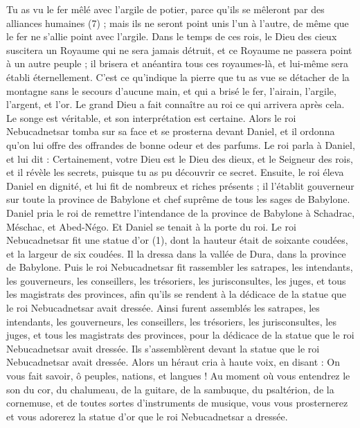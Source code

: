 \begin{multicols}{2}
Tu as vu le fer mêlé avec l’argile de potier, parce qu'ils se mêleront par des alliances humaines (7) ; mais ils ne seront point unis l’un à l'autre, de même que le fer ne s’allie point avec l’argile.
Dans le temps de ces rois, le Dieu des cieux suscitera un Royaume qui ne sera jamais détruit, et ce Royaume ne passera point à un autre peuple ; il brisera et anéantira tous ces royaumes-là, et lui-même sera établi éternellement.
C’est ce qu’indique la pierre que tu as vue se détacher de la montagne sans le secours d’aucune main, et qui a brisé le fer, l'airain, l’argile, l'argent, et l'or. Le grand Dieu a fait connaître au roi ce qui arrivera après cela. Le songe est véritable, et son interprétation est certaine.
Alors le roi Nebucadnetsar tomba sur sa face et se prosterna devant Daniel, et il ordonna qu'on lui offre des offrandes de bonne odeur et des parfums.
Le roi parla à Daniel, et lui dit : Certainement, votre Dieu est le Dieu des dieux, et le Seigneur des rois, et il révèle les secrets, puisque tu as pu découvrir ce secret.
Ensuite, le roi éleva Daniel en dignité, et lui fit de nombreux et riches présents ; il l'établit gouverneur sur toute la province de Babylone et chef suprême de tous les sages de Babylone.
Daniel pria le roi de remettre l’intendance de la province de Babylone à Schadrac, Méschac, et Abed-Négo. Et Daniel se tenait à la porte du roi.
\VerseOne{}Le roi Nebucadnetsar fit une statue d'or (1), dont la hauteur était de soixante coudées, et la largeur de six coudées.  Il la dressa dans la vallée de Dura, dans la province de Babylone.
Puis le roi Nebucadnetsar fit rassembler les satrapes, les intendants, les gouverneurs, les conseillers, les trésoriers, les jurisconsultes, les juges, et tous les magistrats des provinces, afin qu'ils se rendent à la dédicace de la statue que le roi Nebucadnetsar avait dressée.
Ainsi furent assemblés les satrapes, les intendants, les gouverneurs, les conseillers, les trésoriers, les jurisconsultes, les juges, et tous les magistrats des provinces, pour la dédicace de la statue que le roi Nebucadnetsar avait dressée.  Ils s’assemblèrent devant la statue que le roi Nebucadnetsar avait dressée.
Alors un héraut cria à haute voix, en disant : On vous fait savoir, ô peuples, nations, et langues !
Au moment où vous entendrez le son du cor, du chalumeau, de la guitare, de la sambuque, du psaltérion, de la cornemuse, et de toutes sortes d’instruments de musique, vous vous prosternerez et vous adorerez la statue d'or que le roi Nebucadnetsar a dressée.

\end{multicols}
